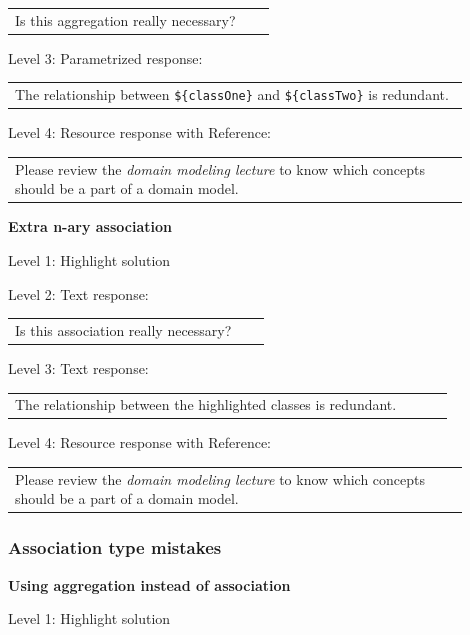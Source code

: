 \begin{tabular}{|p{0.9\linewidth}}
Is this aggregation really necessary?
\end{tabular} \medskip

\noindent Level 3: Parametrized response: \medskip

\begin{tabular}{|p{0.9\linewidth}}
The relationship between \verb|${classOne}| and \verb|${classTwo}| is redundant.
\end{tabular} \medskip

\noindent Level 4: Resource response with Reference: \medskip

\begin{tabular}{|p{0.9\linewidth}}
Please review the \textit{domain modeling lecture} to know which concepts should be a part of a domain model.
\end{tabular} \medskip


\noindent \textbf{Extra n-ary association} \medskip

\noindent Level 1: Highlight solution  \medskip

\noindent Level 2: Text response: \medskip

\begin{tabular}{|p{0.9\linewidth}}
Is this association really necessary?
\end{tabular} \medskip

\noindent Level 3: Text response: \medskip

\begin{tabular}{|p{0.9\linewidth}}
The relationship between the highlighted classes is redundant.
\end{tabular} \medskip

\noindent Level 4: Resource response with Reference: \medskip

\begin{tabular}{|p{0.9\linewidth}}
Please review the \textit{domain modeling lecture} to know which concepts should be a part of a domain model.
\end{tabular} \medskip


\subsubsection{Association type mistakes}

\noindent \textbf{Using aggregation instead of association} \medskip

\noindent Level 1: Highlight solution  \medskip

